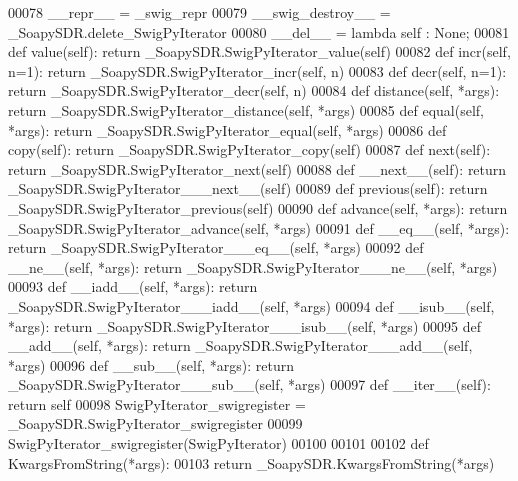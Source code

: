 \begin{DoxyCode}
{{00078     \_\_repr\_\_ = \_swig\_repr
00079     \_\_swig\_destroy\_\_ = \_SoapySDR.delete\_SwigPyIterator
00080     \_\_del\_\_ = \textcolor{keyword}{lambda} self : \textcolor{keywordtype}{None};
00081     \textcolor{keyword}{def }value(self): \textcolor{keywordflow}{return} \_SoapySDR.SwigPyIterator\_value(self)
00082     \textcolor{keyword}{def }incr(self, n=1): \textcolor{keywordflow}{return} \_SoapySDR.SwigPyIterator\_incr(self, n)
00083     \textcolor{keyword}{def }decr(self, n=1): \textcolor{keywordflow}{return} \_SoapySDR.SwigPyIterator\_decr(self, n)
00084     \textcolor{keyword}{def }distance(self, *args): \textcolor{keywordflow}{return} \_SoapySDR.SwigPyIterator\_distance(self, *args)
00085     \textcolor{keyword}{def }equal(self, *args): \textcolor{keywordflow}{return} \_SoapySDR.SwigPyIterator\_equal(self, *args)
00086     \textcolor{keyword}{def }copy(self): \textcolor{keywordflow}{return} \_SoapySDR.SwigPyIterator\_copy(self)
00087     \textcolor{keyword}{def }next(self): \textcolor{keywordflow}{return} \_SoapySDR.SwigPyIterator\_next(self)
00088     \textcolor{keyword}{def }__next__(self): \textcolor{keywordflow}{return} \_SoapySDR.SwigPyIterator\_\_\_next\_\_(self)
00089     \textcolor{keyword}{def }previous(self): \textcolor{keywordflow}{return} \_SoapySDR.SwigPyIterator\_previous(self)
00090     \textcolor{keyword}{def }advance(self, *args): \textcolor{keywordflow}{return} \_SoapySDR.SwigPyIterator\_advance(self, *args)
00091     \textcolor{keyword}{def }__eq__(self, *args): \textcolor{keywordflow}{return} \_SoapySDR.SwigPyIterator\_\_\_eq\_\_(self, *args)
00092     \textcolor{keyword}{def }__ne__(self, *args): \textcolor{keywordflow}{return} \_SoapySDR.SwigPyIterator\_\_\_ne\_\_(self, *args)
00093     \textcolor{keyword}{def }__iadd__(self, *args): \textcolor{keywordflow}{return} \_SoapySDR.SwigPyIterator\_\_\_iadd\_\_(self, *args)
00094     \textcolor{keyword}{def }__isub__(self, *args): \textcolor{keywordflow}{return} \_SoapySDR.SwigPyIterator\_\_\_isub\_\_(self, *args)
00095     \textcolor{keyword}{def }__add__(self, *args): \textcolor{keywordflow}{return} \_SoapySDR.SwigPyIterator\_\_\_add\_\_(self, *args)
00096     \textcolor{keyword}{def }__sub__(self, *args): \textcolor{keywordflow}{return} \_SoapySDR.SwigPyIterator\_\_\_sub\_\_(self, *args)
00097     \textcolor{keyword}{def }__iter__(self): \textcolor{keywordflow}{return} self
00098 SwigPyIterator\_swigregister = \_SoapySDR.SwigPyIterator\_swigregister
00099 SwigPyIterator_swigregister(SwigPyIterator)
00100 
00101 
00102 \textcolor{keyword}{def }KwargsFromString(*args):
00103   \textcolor{keywordflow}{return} \_SoapySDR.KwargsFromString(*args)
}}
\end{DoxyCode}
